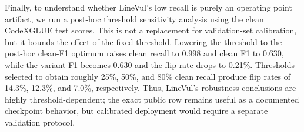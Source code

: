 \documentclass[a4paper,fleqn]{cas-dc}
\begin{document}
\begin{table}[t]
  \centering
  \caption{Aggregation and selective-prediction diagnostics for exact public checkpoints on CodeXGLUE/Devign. Calibrated rows use post-hoc clean-test thresholds.}
  \label{tab:public-aggregation}
\end{table}

Finally, to understand whether LineVul's low recall is purely an operating
point artifact, we run a post-hoc threshold sensitivity analysis using the
clean CodeXGLUE test scores. This is not a replacement for validation-set
calibration, but it bounds the effect of the fixed threshold. Lowering the
threshold to the post-hoc clean-F1 optimum raises clean recall to 0.998 and
clean F1 to 0.630, while the variant F1 becomes 0.630 and the flip rate drops
to 0.21\%. Thresholds selected to obtain roughly 25\%, 50\%, and 80\% clean
recall produce flip rates of 14.3\%, 12.3\%, and 7.0\%, respectively. Thus,
LineVul's robustness conclusions are highly threshold-dependent; the exact
public row remains useful as a documented checkpoint behavior, but calibrated
deployment would require a separate validation protocol.
\end{document}

